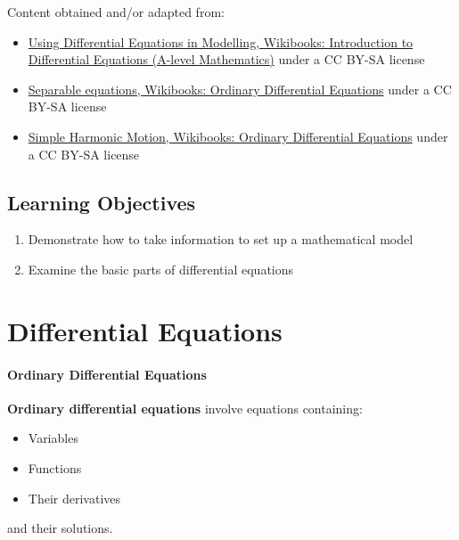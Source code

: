 Content obtained and/or adapted from:
\begin{itemize}
    \item \href{https://en.wikibooks.org/wiki/A-level_Mathematics/MEI/DE/Introduction_to_Differential_Equations/Using_Differential_Equations_in_Modelling}{Using Differential Equations in Modelling, Wikibooks: Introduction to Differential Equations (A-level Mathematics)} under a CC BY-SA license
    \item \href{https://en.wikibooks.org/wiki/Ordinary_Differential_Equations/Separable_2}{Separable equations, Wikibooks: Ordinary Differential Equations} under a CC BY-SA license
    \item \href{https://en.wikibooks.org/wiki/Ordinary_Differential_Equations/Simple_Harmonic_Motion}{Simple Harmonic Motion, Wikibooks: Ordinary Differential Equations} under a CC BY-SA license
\end{itemize}

\subsection{Learning Objectives}

\begin{enumerate}
    \item Demonstrate how to take information to set up a mathematical model
    \item Examine the basic parts of differential equations
\end{enumerate}

\section{Differential Equations}
\label{sec:differential-equations}

\paragraph{Ordinary Differential Equations}



\textbf{Ordinary differential equations} involve equations containing:

\begin{itemize}
    \item Variables
    \item Functions
    \item Their derivatives
\end{itemize}
and their solutions.



